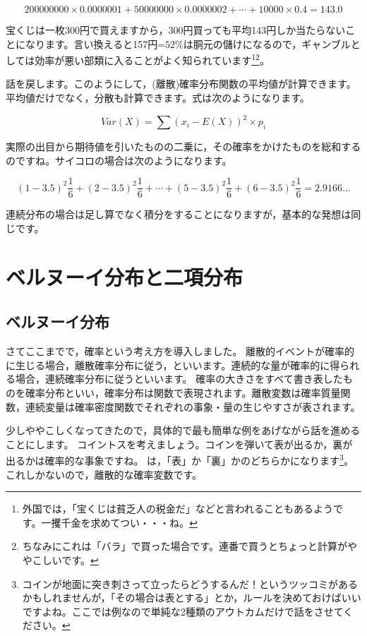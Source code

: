 \documentclass{ltjbook}
\begin{document}
\[200000000 \times 0.0000001 + 50000000 \times 0.0000002 + \cdots + 10000\times0.4=143.0 \]

宝くじは一枚300円で買えますから，300円買っても平均143円しか当たらないことになります。言い換えると157円=$52\%$は胴元の儲けになるので，ギャンブルとしては効率が悪い部類に入ることがよく知られています\footnote{外国では，「宝くじは貧乏人の税金だ」などと言われることもあるようです。一攫千金を求めてつい・・・ね。}\footnote{ちなみにこれは「バラ」で買った場合です。連番で買うとちょっと計算がややこしいです。}。

話を戻します。このようにして，(離散)確率分布関数の平均値が計算できます。平均値だけでなく，分散も計算できます。式は次のようになります。

\[ Var(X) = \sum (x_i-E(X))^2 \times p_i \]

実際の出目から期待値を引いたものの二乗に，その確率をかけたものを総和するのですね。サイコロの場合は次のようになります。

\[
	(1-3.5)^2\frac{1}{6}+
	(2-3.5)^2\frac{1}{6}+
	\cdots+
	(5-3.5)^2\frac{1}{6}+
	(6-3.5)^2\frac{1}{6} = 2.9166...
\]

連続分布の場合は足し算でなく積分をすることになりますが，基本的な発想は同じです。


\section{ベルヌーイ分布と二項分布}
\label{bernoulli_distribution}
\subsection{ベルヌーイ分布}
さてここまでで，確率という考え方を導入しました。
離散的イベントが確率的に生じる場合，離散確率分布に従う，といいます。連続的な量が確率的に得られる場合，連続確率分布に従うといいます。
確率の大きさをすべて書き表したものを確率分布といい，確率分布は関数で表現されます。離散変数は確率質量関数，連続変量は確率密度関数でそれぞれの事象・量の生じやすさが表されます。

少しややこしくなってきたので，具体的で最も簡単な例をあげながら話を進めることにします。
コイントスを考えましょう。コインを弾いて表が出るか，裏が出るかは確率的な事象ですね。
は，「表」か「裏」かのどちらかになります\footnote{コインが地面に突き刺さって立ったらどうするんだ！というツッコミがあるかもしれませんが，「その場合は表とする」とか，ルールを決めておけばいいですよね。ここでは例なので単純な2種類のアウトカムだけで話をさせてください。}。これしかないので，離散的な確率変数です。
\end{document}
